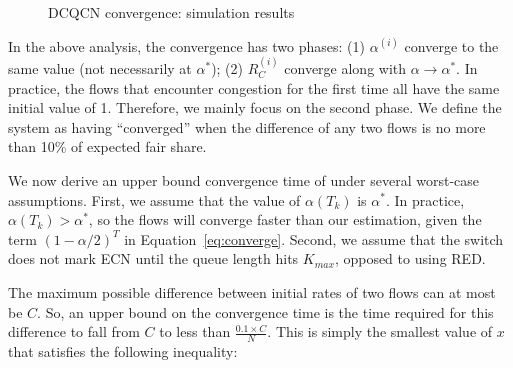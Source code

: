 \begin{figure}[t]
\center
{}
\caption{DCQCN convergence: simulation results}
\label{fig:dcqcn_convergence_sim}
\end{figure}

In the above analysis, the convergence has two phases: (1) $\alpha ^{(i)}$
converge to the same value (not necessarily at $\alpha^*$); (2) $R_C^{(i)}$
converge along with $\alpha \to \alpha^*$.  In practice, the flows that
encounter congestion for the first time all have the same initial value of 1.
Therefore, we mainly focus on the second phase. We define the system as having
``converged'' when the difference of any two flows is no more than 10\% of
expected fair share.

We now derive an upper bound convergence time of under several worst-case
assumptions. First, we assume that the value of $\alpha ({T_k})$ is $\alpha ^*$.
In practice, $\alpha ({T_k}) > \alpha ^*$, so the flows will converge faster
than our estimation, given the term $(1 - \alpha /2)^T$ in
Equation~\ref{eq:converge}.  Second, we assume that the switch does not mark ECN
until the queue length hits $K_{max}$, opposed to using RED. 

The maximum possible difference between initial rates of two flows can at most
be $C$. So, an upper bound on the convergence time is the time required for this
difference to fall from $C$ to less than $\frac{0.1 \times C}{N}$. This is
simply the smallest value of $x$ that satisfies the following inequality: 

